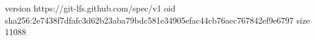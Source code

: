 version https://git-lfs.github.com/spec/v1
oid sha256:2e7438f7dfafc3d62b23aba79bdc581e34905efac44cb76aec767842ef9e6797
size 11088
